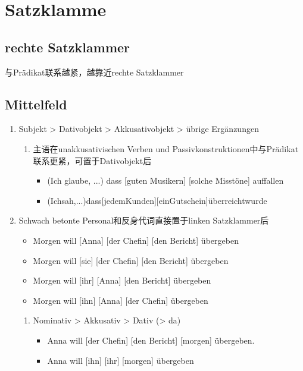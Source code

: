 \documentclass[UTF8]{report}
\begin{document}
\section{Satzklamme}
\subsection{rechte Satzklammer}
与Prädikat联系越紧，越靠近rechte Satzklammer


\subsection{Mittelfeld}
\begin{enumerate}
    \item Subjekt > Dativobjekt > Akkusativobjekt > übrige Ergänzungen
    \begin{enumerate}
        \item 主语在unakkusativischen Verben und Passivkonstruktionen中与Prädikat联系更紧，可置于Dativobjekt后
        \begin{itemize}
            \item (Ich glaube, ...) dass [guten Musikern] [solche Misstöne] auffallen
            \item (Ichsah,...)dass[jedemKunden][einGutschein]überreichtwurde
        \end{itemize}
    \end{enumerate}
    \item  Schwach betonte Personal和反身代词直接置于linken Satzklammer后
    \begin{itemize}
        \item Morgen will [Anna] [der Chefin] [den Bericht] übergeben
        \item Morgen will [sie] [der Chefin] [den Bericht] übergeben
        \item Morgen will [ihr] [Anna] [den Bericht] übergeben
        \item Morgen will [ihn] [Anna] [der Chefin] übergeben
    \end{itemize}
    \begin{enumerate}
        \item Nominativ > Akkusativ > Dativ (> da)
        \begin{itemize}
            \item Anna will [der Chefin] [den Bericht] [morgen] übergeben.
            \item Anna will [ihn] [ihr] [morgen] übergeben
        \end{itemize}

\end{enumerate}
\end{enumerate}
\end{document}
